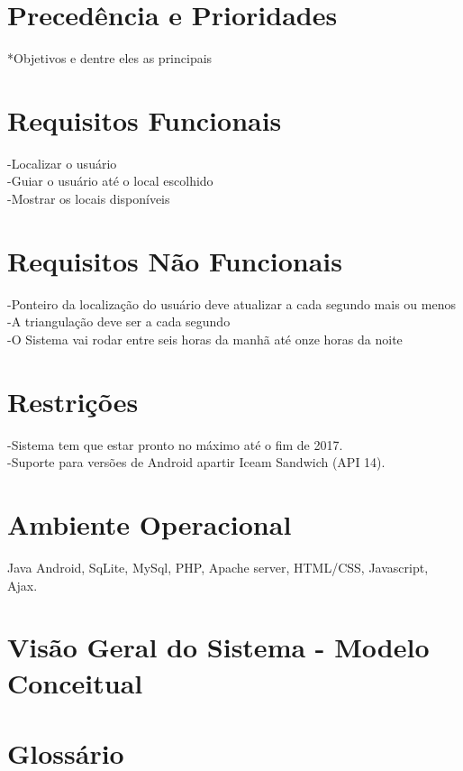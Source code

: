 \documentclass[12pt]{article}
\begin{document}
\section*{Precedência e Prioridades}
*Objetivos e dentre eles as principais
\section*{Requisitos Funcionais}
-Localizar o usuário\\
-Guiar o usuário até o local escolhido\\
-Mostrar os locais disponíveis\\

\section*{Requisitos Não Funcionais}
-Ponteiro da localização do usuário deve atualizar a cada segundo mais ou menos\\
-A triangulação deve ser a cada segundo\\
-O Sistema vai rodar entre seis horas da manhã até onze horas da noite

\section*{Restrições}
-Sistema tem que estar pronto no máximo até o fim de 2017.\\
-Suporte para versões de Android apartir Iceam Sandwich (API 14)\cite{androidVersion}.
\section*{Ambiente Operacional}
Java Android, SqLite, MySql, PHP, Apache server, HTML/CSS, Javascript, Ajax.

\section*{Visão Geral do Sistema - Modelo Conceitual}

\section*{Glossário}



\end{document}
